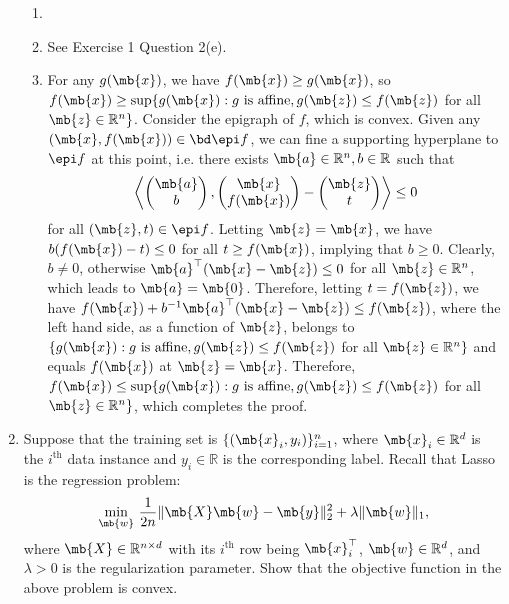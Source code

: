 \begin{exercise}
\begin{enumerate}
      \begin{solution}
        \begin{enumerate}
          \item []
          \item See Exercise 1 Question 2(e).
          \item For any $g(\mb{x})$, we have $f(\mb{x}) \ge g(\mb{x})$, so $f(\mb{x}) \ge \sup\{ g(\mb{x}): g\text{ is affine},g(\mb{z})\le f(\mb{z})$ for all $\mb{z}\in\mathbb{R}^n\}$. Consider the epigraph of $f$, which is convex. Given any $(\mb{x},f(\mb{x}))\in \bd \epi f$, we can fine a supporting hyperplane to $\epi f$ at this point, i.e. there exists $\mb{a} \in \mathbb{R}^n, b\in \mathbb{R}$ such that
            $$
              \left\langle
              \begin{pmatrix}
                \mb{a} \\
                b
              \end{pmatrix},
              \begin{pmatrix}
                \mb{x} \\
                f(\mb{x})
              \end{pmatrix} -
              \begin{pmatrix}
                \mb{z} \\
                t
              \end{pmatrix}
              \right\rangle \le 0
            $$
            for all $(\mb{z},t)\in \epi f$. Letting $\mb{z} = \mb{x}$, we have $b (f(\mb{x}) - t) \le 0$ for all $t \ge f(\mb{x})$, implying that $b \ge 0$. Clearly, $b \neq 0$, otherwise $\mb{a}^\top (\mb{x} -\mb{z})\le 0$ for all $\mb{z}\in \mathbb{R}^n$, which leads to $\mb{a} = \mb{0}$. Therefore, letting $t = f(\mb{z})$, we have $f(\mb{x}) + b^{-1}\mb{a}^\top (\mb{x}-\mb{z}) \le f(\mb{z})$, where the left hand side, as a function of $\mb{z}$, belongs to $\{ g(\mb{x}): g\text{ is affine},g(\mb{z})\le f(\mb{z})$ for all $\mb{z}\in\mathbb{R}^n\}$ and equals $f(\mb{x})$ at $\mb{z} = \mb{x}$. Therefore, $f(\mb{x}) \le \sup\{ g(\mb{x}): g\text{ is affine},g(\mb{z})\le f(\mb{z})$ for all $\mb{z}\in\mathbb{R}^n\}$, which completes the proof.
            \qedhere
        \end{enumerate}
      \end{solution}
      
      
    \item
      Suppose that the training set is $\{(\mb{x}_i,y_i)\}_{i=1}^n$, where $\mb{x}_i\in\mathbb{R}^d$ is the $i^{\text{th}}$ data instance and $y_i\in\mathbb{R}$ is the corresponding label.
      Recall that Lasso is the regression problem:
      \begin{align*}
        \min_{\mb{w}}\,\frac{1}{2n}\|\mb{X}\mb{w}-\mb{y}\|_2^2+\lambda\|\mb{w}\|_1,
      \end{align*}
      where $\mb{X}\in\mathbb{R}^{n\times d}$ with its $i^{\text{th}}$ row being $\mb{x}_i^{\top}$, $\mb{w} \in \mathbb{R}^d$, and $\lambda>0$ is the regularization parameter. Show that the objective function in the above problem is convex.
      

\end{enumerate}
\end{exercise}
